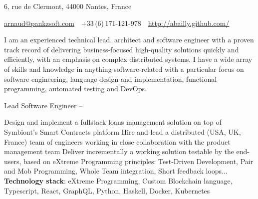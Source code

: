 \documentclass[a4paper,MMMyyyy,nonstopmode]{simpleresumecv}
\newcommand{\CVAuthor}{Arnaud Bailly}
\newcommand{\CVWebpage}{http://abailly.github.com/}
\begin{document}
\Title{\CVAuthor}

\begin{SubTitle}
6, rue de Clermont, 44000 Nantes, France
\par
\href{mailto:arnaud@pankzsoft.com}
{arnaud@pankzsoft.com}
\,\SubBulletSymbol\,
+33\,(6)\,171-121-978
\,\SubBulletSymbol\,
\href{\CVWebpage}
{\url{\CVWebpage}}
\end{SubTitle}

\begin{Body}

  \Section{}{}{}
  \begin{Detail}
    I am an experienced technical lead, architect and software engineer with a proven track record of delivering business-focused high-quality solutions quickly and efficiently, with an emphasis on complex distributed systems. I have a wide array of skills and knowledge in anything software-related with a particular focus on software engineering, language design and implementation, functional programming, automated testing and DevOps.
  \end{Detail}








\Entry
Lead Software Engineer
\hfill
{} --

\begin{Detail}
  \BulletItem
  Design and implement a fullstack loans management solution on top of Symbiont's Smart Contracts platform
  \BulletItem
  Hire and lead a distributed (USA, UK, France) team of engineers working in close collaboration with the product management team
  \BulletItem
  Deliver incrementally a working solution testable by the end-users, based on eXtreme Programming principles: Test-Driven Development, Pair and Mob Programming, Whole Team integration, Short feedback loops...
  \BulletItem
\textbf{Technology stack}: eXtreme Programming, Custom Blockchain language, Typescript, React, GraphQL, Python, Haskell, Docker, Kubernetes
\end{Detail}



\end{Body}
\end{document}
